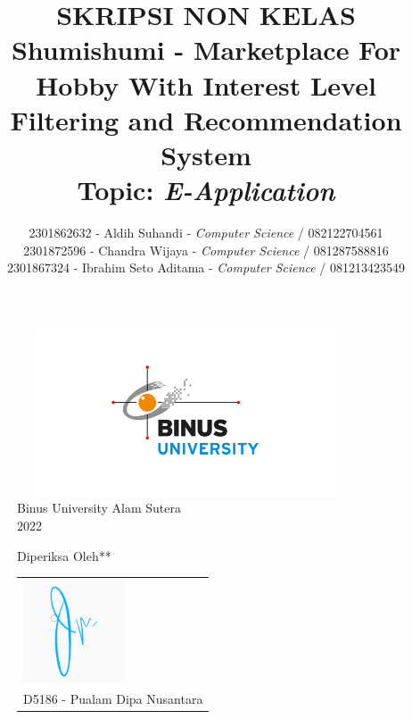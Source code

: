 \documentclass[a4paper]{article}
\begin{document}

\title{SKRIPSI NON KELAS\\Shumishumi - Marketplace For Hobby With Interest Level Filtering and Recommendation System\large\\\textbf{Topic: }\textit{E-Application}}
\author{2301862632 - Aldih Suhandi - \textit{Computer Science} / 082122704561\\2301872596 - Chandra Wijaya - \textit{Computer Science} / 081287588816\\2301867324 - Ibrahim Seto Aditama - \textit{Computer Science} / 081213423549}


\maketitle
\begin{figure}[h]
    \centering
    \includegraphics[width=10cm,height=5cm]{logo_binus.png}\\
    Binus University Alam Sutera\\
    2022
\end{figure}
\begin{figure}[h]
    \centering
    Diperiksa Oleh**\\
    \begin{tabular}{@{}p{2.5in}@{}}
        \centering
        \includegraphics[width=3cm]{ttd.png} \\
        D5186 - Pualam Dipa Nusantara
    \end{tabular}
\end{figure}

\newpage
{}
\tableofcontents
\end{document}
